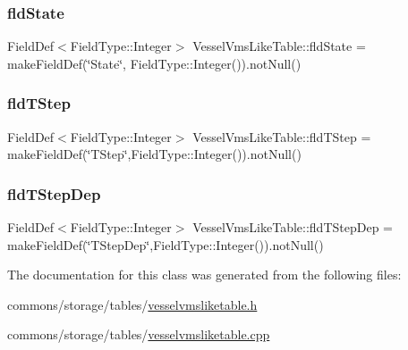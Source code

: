 \mbox{\label{class_vessel_vms_like_table_a2cbcedc208e696f8f73f41bd376e420b}} 
\subsubsection{\texorpdfstring{fldState}{fldState}}
{\footnotesize\ttfamily Field\+Def$<$Field\+Type\+::\+Integer$>$ Vessel\+Vms\+Like\+Table\+::fld\+State = make\+Field\+Def(\char`\"{}State\char`\"{}, Field\+Type\+::\+Integer()).not\+Null()}

\mbox{\label{class_vessel_vms_like_table_a5e10f870c3b87126c01b1b953dea9876}} 
\subsubsection{\texorpdfstring{fldTStep}{fldTStep}}
{\footnotesize\ttfamily Field\+Def$<$Field\+Type\+::\+Integer$>$ Vessel\+Vms\+Like\+Table\+::fld\+T\+Step = make\+Field\+Def(\char`\"{}T\+Step\char`\"{},Field\+Type\+::\+Integer()).not\+Null()}

\mbox{\label{class_vessel_vms_like_table_a3d33393b14a942cca454354db1aa73a3}} 
\subsubsection{\texorpdfstring{fldTStepDep}{fldTStepDep}}
{\footnotesize\ttfamily Field\+Def$<$Field\+Type\+::\+Integer$>$ Vessel\+Vms\+Like\+Table\+::fld\+T\+Step\+Dep = make\+Field\+Def(\char`\"{}T\+Step\+Dep\char`\"{},Field\+Type\+::\+Integer()).not\+Null()}



The documentation for this class was generated from the following files\+:\begin{DoxyCompactItemize}
\item 
commons/storage/tables/\mbox{\hyperlink{vesselvmsliketable_8h}{vesselvmsliketable.\+h}}\item 
commons/storage/tables/\mbox{\hyperlink{vesselvmsliketable_8cpp}{vesselvmsliketable.\+cpp}}\end{DoxyCompactItemize}
